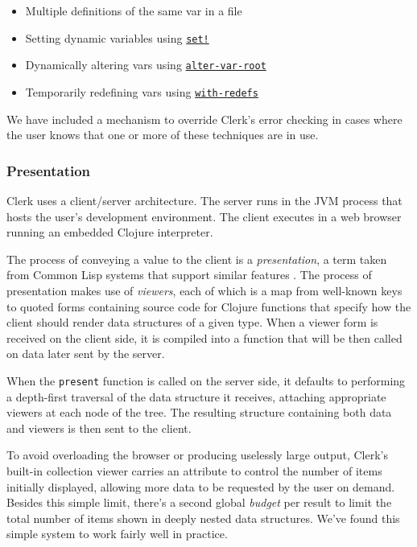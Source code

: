 \documentclass[
]{article}
\newcommand{\passthrough}[1]{#1}
\providecommand{\tightlist}{%
  \setlength{\itemsep}{0pt}\setlength{\parskip}{0pt}}
\begin{document}
\begin{itemize}
\tightlist
\item
  Multiple definitions of the same var in a file
\item
  Setting dynamic variables using \href{https://clojuredocs.org/clojure.core/set!}{\passthrough{\lstinline"set!"}}
\item
  Dynamically altering vars using \href{https://clojuredocs.org/clojure.core/alter-var-root}{\passthrough{\lstinline!alter-var-root!}}
\item
  Temporarily redefining vars using \href{https://clojuredocs.org/clojure.core/with-redefs}{\passthrough{\lstinline!with-redefs!}}
\end{itemize}

We have included a mechanism to override Clerk's error checking in cases where the user knows that one or more of these techniques are in use.

\hypertarget{id}{%
\subsubsection{Presentation}\label{id}}

Clerk uses a client/server architecture. The server runs in the JVM process that hosts the user's development environment. The client executes in a web browser running an embedded Clojure interpreter.

The process of conveying a value to the client is a \emph{presentation}, a
term taken from Common Lisp systems that support similar features . The process of presentation makes use of \emph{viewers}, each of which is a map from well-known keys to quoted forms containing source code for Clojure functions that specify how the client should render data structures of a given type. When a viewer form is received on the client side, it is compiled into a function that will be then called on data later sent by the server.

When the \passthrough{\lstinline!present!} function is called on the server side, it defaults to performing a depth-first traversal of the data structure it receives, attaching appropriate viewers at each node of the tree. The resulting structure containing both data and viewers is then sent to the client.

To avoid overloading the browser or producing uselessly large output, Clerk's built-in collection viewer carries an attribute to control the number of items initially displayed, allowing more data to be requested by the user on demand. Besides this simple limit, there's a second global \emph{budget} per result to limit the total number of items shown in deeply nested data structures. We've found this simple system to work fairly well in practice.
\end{document}
